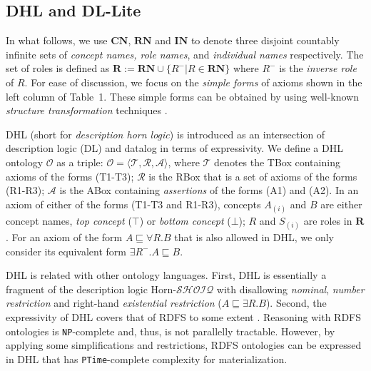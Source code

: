 \documentclass[final,1p,times]{elsarticle}
\begin{document}
\subsection{DHL and DL-Lite}

In what follows, we use $\textbf{CN}$, $\textbf{RN}$ and $\textbf{IN}$
to denote three disjoint countably
infinite sets of \emph{concept names, role names}, and \emph{individual names} respectively.
The set of roles is defined as $\textbf{R}:=\textbf{RN}\cup\{R^-|R\in\textbf{RN}\}$
where $R^-$ is the \emph{inverse role} of $R$.
For ease of discussion, we focus on the \emph{simple forms} of axioms shown
in the left column of Table~1. These simple forms can be obtained by using
well-known \emph{structure transformation} techniques \cite{KrotzschRH07,Kazakov09}.

DHL (short for \emph{description horn logic}) \cite{GrosofHVD03} is introduced as an
intersection of description logic (DL) and datalog in terms of expressivity.
We define a DHL ontology $\mathcal{O}$ as a triple:
$\mathcal{O}=\langle\mathcal{T},\mathcal{R},\mathcal{A}\rangle$, where
$\mathcal{T}$ denotes the TBox containing axioms of the forms (T1-T3);
$\mathcal{R}$ is the RBox that is a set of axioms of the forms (R1-R3);
$\mathcal{A}$ is the ABox containing \emph{assertions} of the forms (A1) and (A2).
In an axiom of either of  the forms (T1-T3 and R1-R3), concepts $A_{(i)}$ and $B$ are either
concept names, \emph{top concept} ($\top$) or \emph{bottom concept} ($\bot$); $R$ and $S_{(i)}$
are roles in $\textbf{R}$.
For an axiom of the form $A\sqsubseteq\forall R.B$ that is also allowed in DHL, we only consider its
equivalent form $\exists R^-.A\sqsubseteq B$.

DHL is related with other ontology languages.
First, DHL is essentially a fragment of the description logic Horn-$\mathcal{SHOIQ}$ with
disallowing \emph{nominal}, \emph{number restriction} and
right-hand \emph{existential restriction} ($A\sqsubseteq\exists R.B$).
Second, the expressivity of DHL covers that of RDFS to some extent \cite{GrosofHVD03}.
Reasoning with RDFS ontologies is \texttt{NP}-complete \cite{Horst05}
and, thus, is not parallelly tractable.
However, by applying some simplifications and restrictions, RDFS ontologies can be
expressed in DHL \cite{GrosofHVD03} that has \texttt{PTime}-complete complexity for
materialization.
\end{document}
